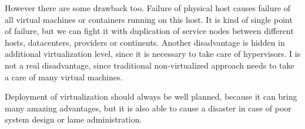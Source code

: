 However there are some drawback too. Failure of physical host causes failure of all virtual machines or containers running on this host. It is kind of single point of failure, but we can fight it with duplication of service nodes between different hosts, datacenters, providers or continents.
Another disadvantage is hidden in additional virtualization level, since it is necessary to take care of hypervisors. I is not a real disadvantage, since traditional non-virtualized approach needs to take a care of many virtual machines.

Deployment of virtualization should always be well planned, because it can bring many amazing advantages, but it is also able to cause a disaster in case of poor system design or lame administration.
